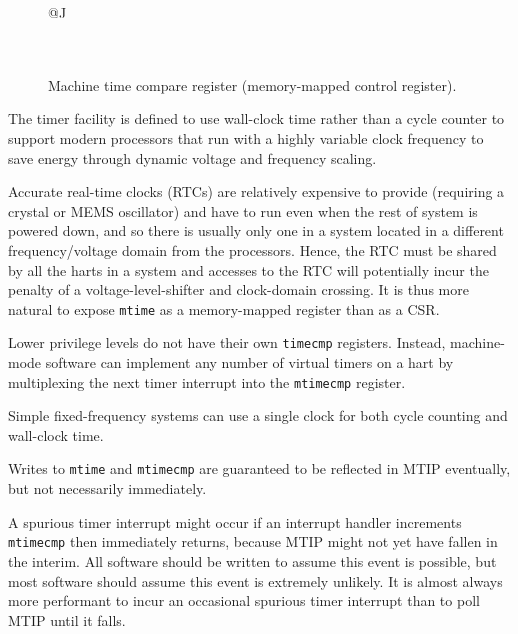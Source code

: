 \begin{figure}[h!]
	{\footnotesize
		\begin{center}
			\begin{tabular}{@{}J}
				 \\
				\hline
				 \\
				 \\
			\end{tabular}
		\end{center}
	}
	\vspace{-0.1in}
	\caption{Machine time compare register (memory-mapped control register).}
\end{figure}

\begin{commentary}
	The timer facility is defined to use wall-clock time rather than a
	cycle counter to support modern processors that run with a highly
	variable clock frequency to save energy through dynamic voltage and
	frequency scaling.

	Accurate real-time clocks (RTCs) are relatively expensive to provide
	(requiring a crystal or MEMS oscillator) and have to run even when the
	rest of system is powered down, and so there is usually only one in a
	system located in a different frequency/voltage domain from the
	processors.  Hence, the RTC must be shared by all the harts in a
	system and accesses to the RTC will potentially incur the penalty of a
	voltage-level-shifter and clock-domain crossing.  It is thus more
	natural to expose {\tt mtime} as a memory-mapped register than as a CSR.

	Lower privilege levels do not have their own {\tt timecmp} registers.
	Instead, machine-mode software can implement any number of virtual timers on
	a hart by multiplexing the next timer interrupt into the {\tt mtimecmp}
	register.

	Simple fixed-frequency systems can use a single clock for both cycle
	counting and wall-clock time.
\end{commentary}

Writes to {\tt mtime} and {\tt mtimecmp} are guaranteed to be reflected in
MTIP eventually, but not necessarily immediately.

\begin{commentary}
	A spurious timer interrupt might occur if an interrupt handler increments {\tt
		mtimecmp} then immediately returns, because MTIP might not yet have fallen in
	the interim.  All software should be written to assume this event is possible,
	but most software should assume this event is extremely unlikely.  It is
	almost always more performant to incur an occasional spurious timer interrupt
	than to poll MTIP until it falls.
\end{commentary}

